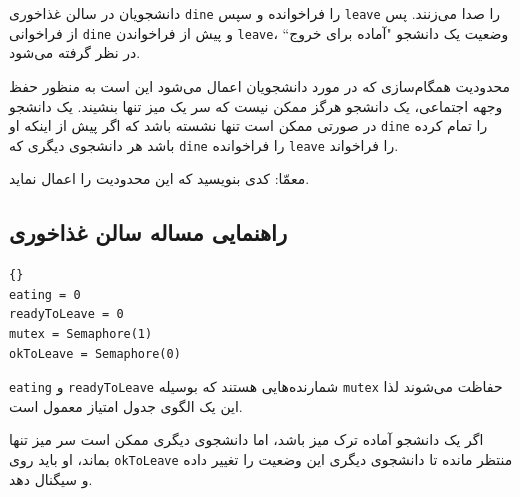 \documentclass{book}
\newcommand{\clearemptydoublepage}{\newpage\cleardoublepage}
\begin{document}
    دانشجویان در سالن غذاخوری  {\tt dine} را فراخوانده و سپس {\tt leave} را صدا می‌زنند. 
    پس از فراخوانی  {\tt dine}  و پیش از فراخواندن {\tt leave}، وضعیت یک دانشجو "آماده برای خروج`` در نظر گرفته می‌شود. 

    محدودیت‌ همگام‌سازی که در مورد دانشجویان اعمال می‌شود این است به منظور حفظ وجهه اجتماعی، یک دانشجو هرگز ممکن نیست که سر 
    یک میز تنها بنشیند. یک دانشجو در صورتی ممکن است تنها نشسته باشد که  اگر پیش از اینکه او {\tt dine} را تمام کرده باشد
    هر  دانشجوی دیگری که {\tt dine} را فراخوانده‌ {\tt leave} را فراخواند. 

    معمّا: کدی بنویسید که این محدودیت را اعمال نماید. 


\clearemptydoublepage
\subsection{راهنمایی مساله سالن غذاخوری}

\begin{latin}
\begin{lstlisting}[title=\rl{راهنمایی مساله سالن غذاخوری}]{}
eating = 0
readyToLeave = 0
mutex = Semaphore(1)
okToLeave = Semaphore(0)
\end{lstlisting}
\end{latin}

    {\tt eating} و {\tt readyToLeave}
    شمارنده‌هایی هستند که بوسیله {\tt mutex} حفاظت می‌شوند لذا این یک الگوی جدول امتیاز معمول است. 
    

    اگر یک دانشجو آماده ترک میز باشد، اما دانشجوی دیگری ممکن است سر میز  تنها بماند، او باید روی {\tt okToLeave}  منتظر مانده تا 
    دانشجوی دیگری این وضعیت را تغییر داده و سیگنال دهد. 
\end{document}
